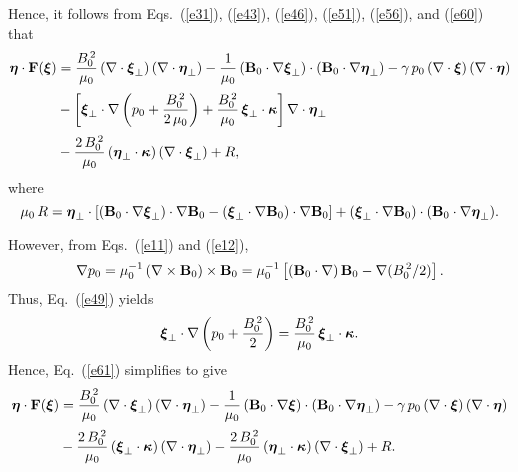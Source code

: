 \documentclass[12pt,prb,aps,notitlepage]{revtex4-1}
\newcommand{\bxi}{\mbox{\boldmath$\xi$}}
\newcommand{\bta}{\mbox{\boldmath$\eta$}}
\newcommand{\bkappa}{\mbox{\boldmath$\kappa$}}
\begin{document}
 Hence, it follows from Eqs.~(\ref{e31}), (\ref{e43}), (\ref{e46}),  (\ref{e51}), (\ref{e56}), and (\ref{e60}) that
 \begin{align}\label{e61}
\bta\cdot {\bf F}(\bxi) &=\frac{B_0^{\,2}}{\mu_0}\,(\nabla\cdot\bxi_\perp)\,(\nabla\cdot\bta_\perp) 
 - \frac{1}{\mu_0}\,({\bf B}_0\cdot\nabla\bxi_\perp)\cdot
 ({\bf B}_0\cdot\nabla\bta_\perp)-\gamma\,p_0\,(\nabla\cdot\bxi)\,(\nabla\cdot\bta)\nonumber\\[0.5ex]
 &-\left[\bxi_\perp\cdot\nabla\left(p_0+\frac{B_0^{\,2}}{2\,\mu_0}\right)+ \frac{B_0^{\,2}}{\mu_0}\,\bxi_\perp\cdot\bkappa\right]\nabla\cdot\bta_\perp\nonumber
\\[0.5ex]&
-\frac{2\,B_0^{\,2}}{\mu_0}\,(\bta_\perp\cdot\bkappa)\,(\nabla\cdot\bxi_\perp) +R,
 \end{align}
 where
 \begin{equation}
 \mu_0\,R= \bta_\perp\cdot\left[({\bf B}_0\cdot\nabla\bxi_\perp)\cdot\nabla {\bf B}_0 - (\bxi_\perp\cdot\nabla {\bf B}_0)\cdot\nabla {\bf B}_0\right]
 + (\bxi_\perp\cdot\nabla {\bf B}_0)\cdot({\bf B}_0\cdot\nabla\bta_\perp).
 \end{equation}
 
 However, from Eqs.~(\ref{e11}) and (\ref{e12}), 
 \begin{equation}\label{e64}
 \nabla p_0 = \mu_0^{-1}\,(\nabla\times{\bf B}_0)\times {\bf B}_0= \mu_0^{-1}\left[({\bf B}_0\cdot\nabla)\,{\bf B}_0-\nabla(B_0^{\,2}/2)\right].
 \end{equation}
 Thus, Eq.~(\ref{e49}) yields
 \begin{equation}
 \bxi_\perp\cdot\nabla\left(p_0 +\frac{B_0^{\,2}}{2}\right) = \frac{B_0^{\,2}}{\mu_0}\,\bxi_\perp\cdot\bkappa.
 \end{equation}
 Hence, Eq.~(\ref{e61}) simplifies to give 
 \begin{align}\label{e65}
\bta\cdot {\bf F}(\bxi) &=\frac{B_0^{\,2}}{\mu_0}\,(\nabla\cdot\bxi_\perp)\,(\nabla\cdot\bta_\perp) 
 - \frac{1}{\mu_0}\,({\bf B}_0\cdot\nabla\bxi)\cdot
 ({\bf B}_0\cdot\nabla\bta_\perp)-\gamma\,p_0\,(\nabla\cdot\bxi)\,(\nabla\cdot\bta)\nonumber\\[0.5ex]
 &-\frac{2\,B_0^{\,2}}{\mu_0}\,(\bxi_\perp\cdot\bkappa)\, (\nabla\cdot\bta_\perp)-\frac{2\,B_0^{\,2}}{\mu_0}\,(\bta_\perp\cdot\bkappa)\,(\nabla\cdot\bxi_\perp) +R.
 \end{align}
\end{document}
